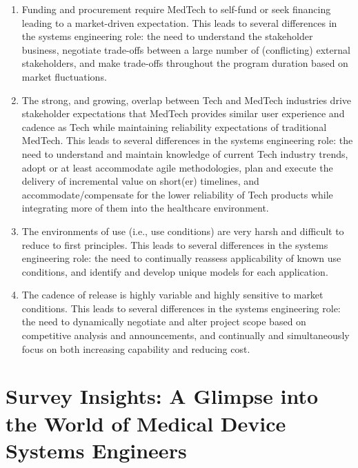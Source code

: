 \documentclass[conference]{IEEEtran}
\begin{document}
    \begin{enumerate}
        \item Funding and procurement require MedTech to self-fund or 
        seek financing leading to a market-driven expectation. 
        This leads to several differences in the systems 
        engineering role: the need to understand the stakeholder 
        business, negotiate trade-offs between a large number 
        of (conflicting) external stakeholders, and make 
        trade-offs throughout the program duration based on 
        market fluctuations.

        \item The strong, and growing, overlap between Tech and MedTech 
        industries drive stakeholder expectations that MedTech 
        provides similar user experience and cadence as Tech 
        while maintaining reliability expectations of traditional 
        MedTech. This leads to several differences in the systems 
        engineering role: the need to understand and maintain 
        knowledge of current Tech industry trends, adopt or at 
        least accommodate agile methodologies, plan and execute 
        the delivery of incremental value on short(er) timelines, 
        and accommodate/compensate for the lower reliability 
        of Tech products while integrating more of them into 
        the healthcare environment.

        \item The environments of use (i.e., use conditions) are very 
        harsh and difficult to reduce to first principles. This 
        leads to several differences in the systems engineering 
        role: the need to continually reassess applicability 
        of known use conditions, and identify and develop 
        unique models for each application.

        \item The cadence of release is highly variable and highly 
        sensitive to market conditions. This leads to several 
        differences in the systems engineering role: the need 
        to dynamically negotiate and alter project scope based 
        on competitive analysis and announcements, and 
        continually and simultaneously focus on both increasing 
        capability and reducing cost.

    \end{enumerate}

\section{Survey Insights: A Glimpse into the World of Medical Device Systems Engineers}
\end{document}
